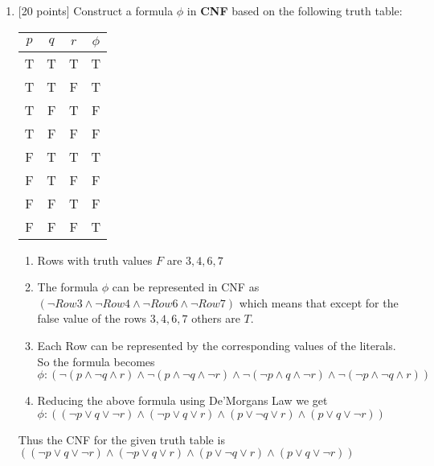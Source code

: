 \documentclass{article}
\begin{document}
\begin{enumerate}
\item {[20 points]} Construct a formula $\phi$ in \textbf{CNF} based on
  the following truth table:
  \begin{center}
    \begin{tabular}{ccc|c}
      $p$ & $q$ & $r$ & $\phi$ \\ \hline
      T & T & T & T\\
      T & T & F & T\\
      T & F & T & F\\
      T & F & F & F\\
      F & T & T & T\\
      F & T & F & F\\
      F & F & T & F\\
      F & F & F & T\\
    \end{tabular}
  \end{center}
  \begin{answer}
  	\begin{enumerate}
  		\item Rows with truth values $F$ are $3, 4, 6, 7$
  		\item The formula $\phi$ can be represented in CNF as $(\neg Row3 \land
  		\neg Row4 \land \neg Row6 \land \neg Row7)$ which means that except for the
  		false value of the rows $3, 4, 6, 7$ others are $T$.
  		\item Each Row can be represented by the corresponding values of the
  		literals. So the formula becomes $\phi : (\neg (p \land \neg q \land r)
  		\land \neg(p \land \neg q \land \neg r) \land \neg(\neg p \land q \land
  		\neg r) \land \neg(\neg p \land \neg q \land r))$
  		\item Reducing the above formula using De'Morgans Law we get $\phi: ((\neg
  		p \lor q \lor \neg r) \land (\neg p \lor q \lor r) \land (p \lor \neg q
  		\lor r) \land (p \lor q \lor \neg r))$
  	\end{enumerate}
  	
  	Thus the CNF for the given truth table is $((\neg
  		p \lor q \lor \neg r) \land (\neg p \lor q \lor r) \land (p \lor \neg q
  		\lor r) \land (p \lor q \lor \neg r))$
  \end{answer}


\end{enumerate}
\end{document}
